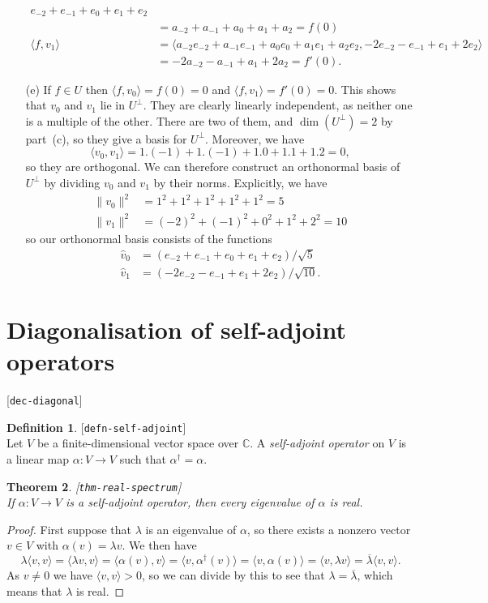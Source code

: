 \documentclass{amsart}
\newcommand{\lbl}[1]{\label{#1}\textup{[\texttt{#1}]}\ \\}
\newcommand{\lbl}{\label}
\newcommand{\C}         {{\mathbb{C}}}
\newcommand{\al}        {\alpha}
\newcommand{\lm}        {\lambda}
\newcommand{\ip}[1]     {\langle #1\rangle}
\newcommand{\ov}[1]     {\overline{#1}}
\renewcommand{\:}       {\colon}
\newtheorem{theorem}{Theorem}[section]
\theoremstyle{definition}
\newtheorem{definition}[theorem]{Definition}
\renewenvironment{solution}{\SolutionAtEnd}{\endSolutionAtEnd}
\begin{document}
\begin{solution}
\begin{itemize}
\begin{align*}
{                      e_{-2} + e_{-1} + e_0 + e_1 + e_2 } \\
               &= a_{-2} + a_{-1} + a_0 + a_1 + a_2 = f(0) \\
    \ip{f,v_1} &= \ip{a_{-2}e_{-2}+a_{-1}e_{-1}+a_0e_0+a_1e_1+a_2e_2,
                      -2e_{-2} - e_{-1} + e_1 + 2 e_2 } \\
               &= -2a_{-2} - a_{-1} + a_1 + 2 a_2 = f'(0).
   \end{align*}
  \item[(e)] If $f\in U$ then $\ip{f,v_0}=f(0)=0$ and
   $\ip{f,v_1}=f'(0)=0$.  This shows that $v_0$ and $v_1$ lie in
   $U^\perp$.  They are clearly linearly independent, as neither one
   is a multiple of the other.  There are two of them, and
   $\dim(U^\perp)=2$ by part~(c), so they give a basis for $U^\perp$.
   Moreover, we have
   \[ \ip{v_0,v_1} = 1.(-1) + 1.(-1) + 1.0 + 1.1 + 1.2 = 0, \]
   so they are orthogonal.  We can therefore construct an orthonormal
   basis of $U^\perp$ by dividing $v_0$ and $v_1$ by their norms.
   Explicitly, we have 
   \begin{align*}
    \|v_0\|^2 &= 1^2 + 1^2 + 1^2 + 1^2 + 1^2 = 5 \\
    \|v_1\|^2 &= (-2)^2 + (-1)^2 + 0^2 + 1^2 + 2^2 = 10
   \end{align*}
   so our orthonormal basis consists of the functions
   \begin{align*}
    \hat{v}_0 &= (e_{-2} + e_{-1} + e_0 + e_1 + e_2)/\sqrt{5} \\
    \hat{v}_1 &= (-2e_{-2} -e_{-1} + e_1 + 2e_2)/\sqrt{10}.
   \end{align*}
 \end{itemize}
\end{solution}

\section{Diagonalisation of self-adjoint operators}
\lbl{dec-diagonal}

\begin{definition}\lbl{defn-self-adjoint}
 Let $V$ be a finite-dimensional vector space over $\C$.
 A \emph{self-adjoint operator} on $V$ is a linear map
 $\al\:V\to V$ such that $\al^\dag=\al$.
\end{definition}

\begin{theorem}\lbl{thm-real-spectrum}
 If $\al\:V\to V$ is a self-adjoint operator, then every
 eigenvalue of $\al$ is real.
\end{theorem}
\begin{proof}
 First suppose that $\lm$ is an eigenvalue of $\al$, so
 there exists a nonzero vector $v\in V$ with
 $\al(v)=\lm v$.  We then have
 \[ \lm \ip{v,v} = \ip{\lm v,v} = \ip{\al(v),v} = 
    \ip{v,\al^\dag(v)} = \ip{v,\al(v)} = 
    \ip{v,\lm v} = \ov{\lm}\ip{v,v}.
 \]
 As $v\neq 0$ we have $\ip{v,v}>0$, so we can divide by this
 to see that $\lm=\ov{\lm}$, which means that $\lm$ is real.
\end{proof}
\end{document}
